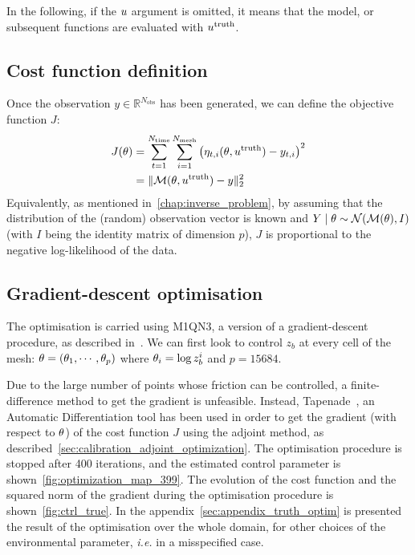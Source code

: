\documentclass[../../Main_ManuscritThese.tex]{subfiles}
\newcommand{\zob}{z_b}
\begin{document}
In the following, if the $u$ argument is omitted, it means that the
model, or subsequent functions are evaluated with
$u^{\mathrm{truth}}$.
\subsection{Cost function definition}
Once the observation $y \in \mathbb{R}^{N_{\mathrm{obs}}}$ has been generated, we can
define the objective function $J$:
\begin{align}
  \label{eq:cost_fun_definition}
  J(\theta) &= \sum_{t=1}^{ N_{\mathrm{time}}}\sum_{i=1}^{N_{\mathrm{mesh}}}  \left(\eta_{t,i}(\theta,u^{\mathrm{truth}}) - y_{t, i}\right)^2 \\
         &= \|\mathcal{M}(\theta,u^{\mathrm{truth}}) - y\|_2^2
\end{align}
Equivalently, as mentioned in~\cref{chap:inverse_problem}, by assuming
that the distribution of the (random) observation vector is known and
$Y \mid \theta \sim \mathcal{N}(\mathcal{M}(\theta), I)$ (with $I$ being the
identity matrix of dimension $p$), $J$ is proportional to the negative
log-likelihood of the data.

\subsection{Gradient-descent optimisation}
\label{ssec:optim_gradient}
The optimisation is carried using M1QN3, a version of a
gradient-descent procedure, as described
in~\cite{gilbert_numerical_1989}. We can first look to control $\zob$
at every cell of the mesh: $\theta = (\theta_1,\cdots, \theta_p)$ where
$\kk_i = \log\zob^i$ and $p=\num{15684}$.

Due to the large number of points whose friction can be controlled, a
finite-difference method to get the gradient is unfeasible. Instead,
Tapenade~\citep{hascoet_tapenade_2013}, an Automatic Differentiation
tool has been used in order to get the gradient (with respect to
$\theta$) of the cost function $J$ using the adjoint method, as
described~\cref{sec:calibration_adjoint_optimization}. The
optimisation procedure is stopped after \num{400} iterations, and the
estimated control parameter is
shown~\cref{fig:optimization_map_399}. The evolution of the cost
function and the squared norm of the gradient during the optimisation
procedure is shown~\cref{fig:ctrl_true}.  In the
appendix~\cref{sec:appendix_truth_optim} is presented the result of
the optimisation over the whole domain, for other choices of the
environmental parameter, \emph{i.e.} in a misspecified case.
\end{document}
